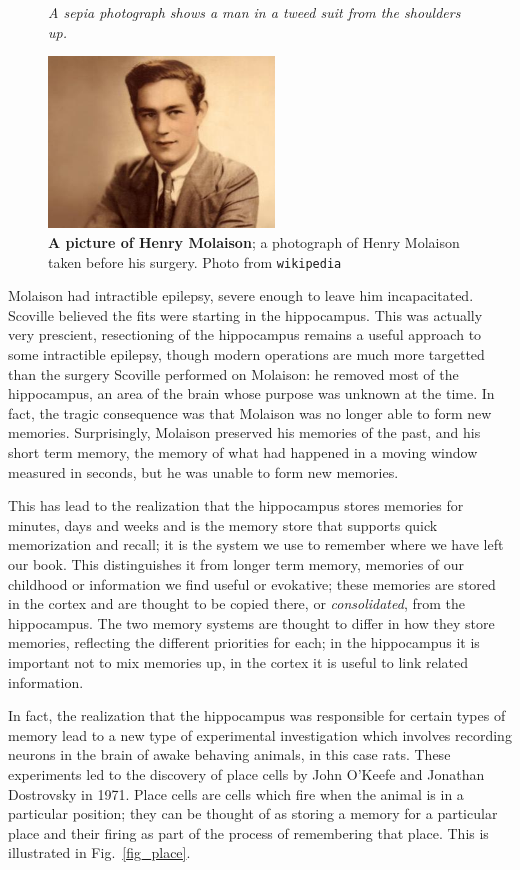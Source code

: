 \documentclass[12pt]{article}
\begin{document}
\begin{figure}[tbhp]
{\textsl{A sepia photograph shows a man in a tweed suit from the shoulders up.}}
{
  \begin{center}
  \includegraphics[width=6cm]{HM.jpg}
  \end{center}
  }
  \caption{\textbf{A picture of Henry Molaison}; a photograph of Henry Molaison taken before his surgery. Photo from
    \texttt{wikipedia}\label{fig_hm}}
\end{figure}


Molaison had intractible epilepsy, severe enough to leave him
incapacitated. Scoville believed the fits were starting in the
hippocampus. This was actually very prescient, resectioning of the
hippocampus remains a useful approach to some intractible epilepsy,
though modern operations are much more targetted than the surgery
Scoville performed on Molaison: he removed most of the hippocampus, an
area of the brain whose purpose was unknown at the time. In fact, the
tragic consequence was that Molaison was no longer able to form new
memories. Surprisingly, Molaison preserved his memories of the past,
and his short term memory, the memory of what had happened in a moving
window measured in seconds, but he was unable to form new
memories.

This has lead to the realization that the hippocampus stores memories
for minutes, days and weeks and is the memory store that supports
quick memorization and recall; it is the system we use to remember
where we have left our book. This distinguishes it from longer term
memory, memories of our childhood or information we find useful or
evokative; these memories are stored in the cortex and are thought to
be copied there, or \textsl{consolidated}, from the hippocampus. The
two memory systems are thought to differ in how they store memories,
reflecting the different priorities for each; in the hippocampus it is
important not to mix memories up, in the cortex it is useful to link
related information.

In fact, the realization that the hippocampus was responsible for
certain types of memory lead to a new type of experimental
investigation which involves recording neurons in the brain of awake
behaving animals, in this case rats. These experiments led to the
discovery of place cells by John O'Keefe and Jonathan Dostrovsky in
1971. Place cells are cells which fire when the animal is in a
particular position; they can be thought of as storing a memory for a
particular place and their firing as part of the process of
remembering that place. This is illustrated in Fig.~\ref{fig_place}.
\end{document}
